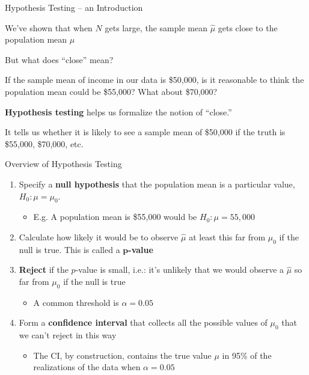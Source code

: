 \documentclass[11pt,english,handout]{beamer}
\newenvironment{wideitemize}{\itemize\addtolength{\itemsep}{10pt}}{\enditemize}
\begin{document}
\begin{frame}{Hypothesis Testing -- an Introduction}
\begin{wideitemize}

\item
We've shown that when $N$ gets large, the sample mean $\hat\mu$ gets close to the population mean $\mu$

\item
But what does ``close'' mean? 

\item
If the sample mean of income in our data is \$50,000, is it reasonable to think the population mean could be \$55,000? What about \$70,000? 

\pause
\item
\textbf{Hypothesis testing} helps us formalize the notion of ``close.''

\pause
\item
It tells us whether it is likely to see a sample mean of \$50,000 if the truth is \$55,000,  \$70,000, etc.

\end{wideitemize}
\end{frame}


\begin{frame}{Overview of Hypothesis Testing}

\begin{enumerate}
	\item 
	Specify a \textbf{null hypothesis} that the population mean is a particular value, $H_0: \mu = \mu_0$.
\smallskip
		\begin{itemize}
			\item 
			E.g. A population mean is \$55,000 would be $H_0: \mu = 55,000$
			\end{itemize}
	
	\medskip
	\pause
	\item
	Calculate how likely it would be to observe $\hat\mu$ at least this far from $\mu_0$ if the null is true. This is called a \textbf{$\mathbf{p}$-value}
	\medskip
	\pause
	\item
	\textbf{Reject} if the $p$-value is small, i.e.: it's unlikely that we would observe a $\hat\mu$ so far from $\mu_0$ if the null is true 
\smallskip
		\begin{itemize}
		\pause 
		\item
		A common threshold is $\alpha=0.05$ 
	\end{itemize}
	
	\vspace{.1cm}
	\pause
	\item
	
	Form a \textbf{confidence interval} that collects all the possible values of $\mu_0$ that we can't reject in this way
		\begin{itemize}
			\pause
			\item
			The CI, by construction, contains the true value $\mu$ in 95\% of the realizations of the data when $\alpha = 0.05$ 
		\end{itemize}
\end{enumerate}
	
\end{frame}
\end{document}
